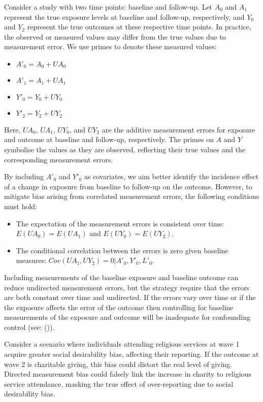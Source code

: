 \documentclass[
  singlecolumn,
  9pt]{article}
\providecommand{\tightlist}{%
  \setlength{\itemsep}{0pt}\setlength{\parskip}{0pt}}\usepackage{longtable,booktabs,array}
\begin{document}
Consider a study with two time points: baseline and follow-up. Let
\(A_0\) and \(A_1\) represent the true exposure levels at baseline and
follow-up, respectively, and \(Y_0\) and \(Y_2\) represent the true
outcomes at these respective time points. In practice, the observed or
measured values may differ from the true values due to measurement
error. We use primes to denote these measured values:

\begin{itemize}
\tightlist
\item
  \(A'_0 = A_0 + UA_0\)
\item
  \(A'_1 = A_1 + UA_1\)
\item
  \(Y'_0 = Y_0 + UY_0\)
\item
  \(Y'_2 = Y_2 + UY_2\)
\end{itemize}

Here, \(UA_0\), \(UA_1\), \(UY_0\), and \(UY_2\) are the additive
measurement errors for exposure and outcome at baseline and follow-up,
respectively. The primes on \(A\) and \(Y\) symbolise the values as they
are observed, reflecting their true values and the corresponding
measurement errors.

By including \(A'_0\) and \(Y'_0\) as covariates, we aim better identify
the incidence effect of a change in exposure from baseline to follow-up
on the outcome. However, to mitigate bias arising from correlated
measurement errors, the following conditions must hold:

\begin{itemize}
\tightlist
\item
  The expectation of the measurement errors is consistent over time:
  \(E(UA_0) = E(UA_1)\) and \(E(UY_0) = E(UY_2)\).
\item
  The conditional correlation between the errors is zero given baseline
  measures: \(Cov(UA_1, UY_2) = 0 | A'_0,Y'_0,L'_0\).
\end{itemize}

Including measurements of the baseline exposure and baseline outcome can
reduce undirected measurement errors, but the strategy require that the
errors are both constant over time and undirected. If the errors vary
over time or if the the exposure affects the error of the outcome then
controlling for baseline measurements of the exposure and outcome will
be inadequate for confounding control (see:
()).

Consider a scenario where individuals attending religious services at
wave 1 acquire greater social desirability bias, affecting their
reporting. If the outcome at wave 2 is charitable giving, this bias
could distort the real level of giving. Directed measurement bias could
falsely link the increase in charity to religious service attendance,
masking the true effect of over-reporting due to social desirability
bias.
\end{document}

